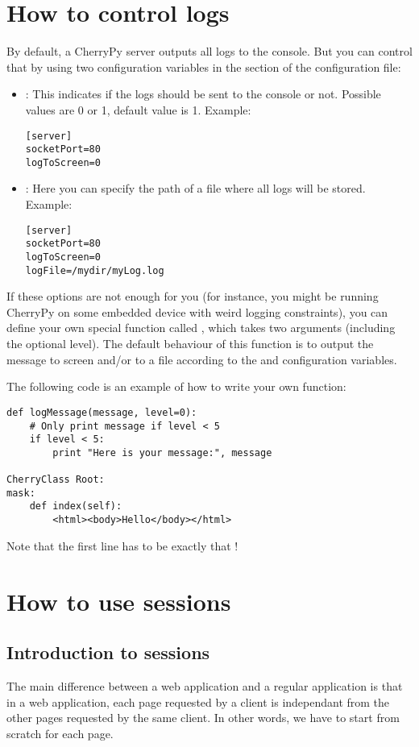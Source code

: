 \documentclass{manual}
\begin{document}
\chapter{How to control logs}
By default, a CherryPy server outputs all logs to the console. But you can control that by using two configuration variables
in the \strong{[server]} section of the configuration file:
\begin{itemize}
\item
{}: This indicates if the logs should be sent to the console or not. Possible values are 0 or 1, default value is 1. Example:
\begin{verbatim}
[server]
socketPort=80
logToScreen=0
\end{verbatim}
\item
{}: Here you can specify the path of a file where all logs will be stored. Example:
\begin{verbatim}
[server]
socketPort=80
logToScreen=0
logFile=/mydir/myLog.log
\end{verbatim}
\end{itemize}

If these options are not enough for you (for instance, you might be running CherryPy on some embedded device with weird
logging constraints), you can define your own special function called , which takes two arguments (including the optional level). The default behaviour of this function is to output the message to screen and/or to a file according to
the  and  configuration variables.

The following code is an example of how to write your own  function:
\begin{verbatim}
def logMessage(message, level=0):
    # Only print message if level < 5
    if level < 5:
        print "Here is your message:", message

CherryClass Root:
mask:
    def index(self):
        <html><body>Hello</body></html>
\end{verbatim}

Note that the first line  has to be exactly that !

\chapter{How to use sessions}
\section{Introduction to sessions}
The main difference between a web application and a regular application is that in a web application, each page requested by
a client is independant from the other pages requested by the same client. In other words, we have to start from
scratch for each page.
\end{document}
